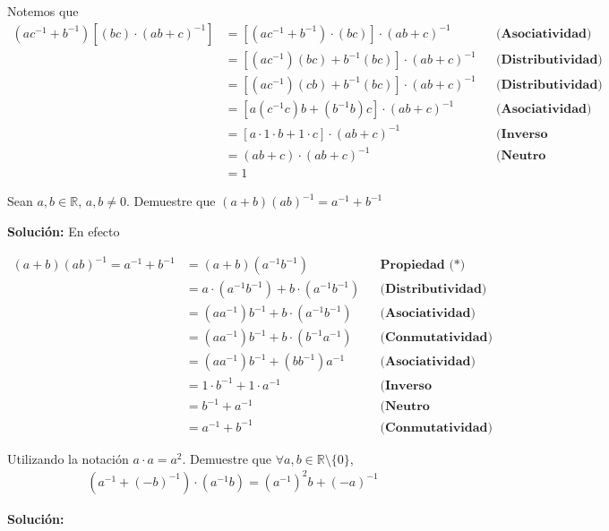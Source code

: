 \documentclass[12pt]{book}
\begin{document}
Notemos que 
\begin{align*}
    (ac^{-1}+b^{-1})[(bc)\cdot (ab+c)^{-1}] &=  [(ac^{-1}+b^{-1})\cdot(bc)]\cdot (ab+c)^{-1} && \textbf{(Asociatividad)} \\
    &=[(ac^{-1})(bc)+b^{-1}(bc)] \cdot (ab+c)^{-1} && \textbf{(Distributividad)} \\
    &=[(ac^{-1})(cb)+b^{-1}(bc)] \cdot (ab+c)^{-1} && \textbf{(Distributividad)} \\
    &=[a(c^{-1}c)b+(b^{-1}b)c] \cdot (ab+c)^{-1} && \textbf{(Asociatividad)} \\
    &=[a \cdot 1 \cdot b + 1 \cdot c ] \cdot (ab+c)^{-1} && \textbf{(Inverso Multiplicativo)} \\
    &=(ab+c) \cdot (ab+c)^{-1}   && \textbf{(Neutro Multiplicativo)} \\
    &=1
\end{align*}

\begin{prob}
    Sean $a,b \in \mathbb{R}$, $a,b \neq 0$. Demuestre que $(a+b)(ab)^{-1}=a^{-1}+b^{-1}$
\end{prob}
\textbf{Solución:}
En efecto

\begin{align*}
    (a+b)(ab)^{-1}=a^{-1}+b^{-1}&=(a+b)(a^{-1}b^{-1}) && \textbf{Propiedad (*)} \\
    &=a\cdot (a^{-1} b^{-1}) + b \cdot (a^{-1}b^{-1}) && \textbf{(Distributividad)} \\
    &= (a a^{-1})b^{-1} +  b \cdot (a^{-1}b^{-1}) && \textbf{(Asociatividad)} \\
    &=  (a a^{-1})b^{-1} +  b \cdot ( b^{-1}a^{-1}) && \textbf{(Conmutatividad)} \\
    &=  (a a^{-1})b^{-1} +  (bb^{-1})a^{-1} && \textbf{(Asociatividad)} \\
    &= 1\cdot b^{-1} +1 \cdot a^{-1} && \textbf{(Inverso Multiplicativo)} \\
    &=b^{-1} +a^{-1} && \textbf{(Neutro Multiplicativo)} \\
    &= a^{-1}+b^{-1} && \textbf{(Conmutatividad)} 
\end{align*}

\begin{prob}
    \quad \quad
    Utilizando la notación $a \cdot a = a^2$. Demuestre que $\forall a,b \in \mathbb{R}\setminus \{0\}$,
    \begin{align*}
        (a^{-1}+(-b)^{-1})\cdot (a^{-1}b)=(a^{-1})^2 b + (-a)^{-1}
    \end{align*}
\end{prob}
\textbf{Solución:}
\end{document}
